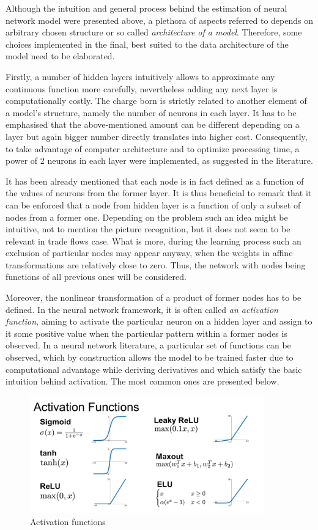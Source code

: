 \documentclass{Trade_template}
\numberwithin{equation}{section}
\begin{document}
Although the intuition and general process behind the estimation of neural network model were presented above, a plethora of aspects referred to depends on arbitrary chosen structure or so called \textit{architecture of a model}. Therefore, some choices implemented in the final, best suited to the data architecture of the model need to be elaborated.

Firstly, a number of hidden layers intuitively allows to approximate any continuous function more carefully, nevertheless adding any next layer is computationally costly. The charge born is strictly related to another element of a model’s structure, namely the number of neurons in each layer. It has to be emphasised that the above-mentioned amount can be different depending on a layer but again bigger number directly translates into higher cost. Consequently, to take advantage of computer architecture and to optimize processing time, a power of 2 neurons in each layer were implemented, as suggested in the literature.

It has been already mentioned that each node is in fact defined as a function of the values of neurons from the former layer. It is thus beneficial to remark that it can be enforced that a node from hidden layer is a function of only a subset of nodes from a former one. Depending on the problem such an idea might be intuitive, not to mention the picture recognition, but it does not seem to be relevant in trade flows case. What is more, during the learning process such an exclusion of particular nodes may appear anyway, when the weights in affine transformations are relatively close to zero. Thus, the network with nodes being functions of all previous ones will be considered.

Moreover, the nonlinear transformation of a product of former nodes has to be defined. In the neural network framework, it is often called \textit{an activation function}, aiming to activate the particular neuron on a hidden layer and assign to it some positive value when the particular pattern within a former nodes is observed. In a neural network literature, a particular set of functions can be observed, which by construction allows the model to be trained faster due to computational advantage while deriving derivatives and which satisfy the basic intuition behind activation. The most common ones are presented below.

\begin{figure}[H]
\centering
\includegraphics[width=0.9\textwidth]{Activation}
\caption[Activation functions]{Activation functions\footnotemark}
\end{figure} 
\end{document}
